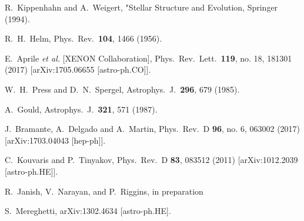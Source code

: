 R.~Kippenhahn and A.~Weigert, "Stellar Structure and Evolution, Springer (1994).

  R.~H.~Helm,
  Phys.\ Rev.\  {\bf 104}, 1466 (1956).


  E.~Aprile {\it et al.} [XENON Collaboration],
  Phys.\ Rev.\ Lett.\  {\bf 119}, no. 18, 181301 (2017)
  [arXiv:1705.06655 [astro-ph.CO]].


  W.~H.~Press and D.~N.~Spergel,
  Astrophys.\ J.\  {\bf 296}, 679 (1985).


  A.~Gould,
  Astrophys.\ J.\  {\bf 321}, 571 (1987).


  J.~Bramante, A.~Delgado and A.~Martin,
  Phys.\ Rev.\ D {\bf 96}, no. 6, 063002 (2017)
  [arXiv:1703.04043 [hep-ph]].


  C.~Kouvaris and P.~Tinyakov,
  Phys.\ Rev.\ D {\bf 83}, 083512 (2011)
  [arXiv:1012.2039 [astro-ph.HE]].


R.~Janish, V.~Narayan, and P.~Riggins, in preparation

  S.~Mereghetti,
  arXiv:1302.4634 [astro-ph.HE].


